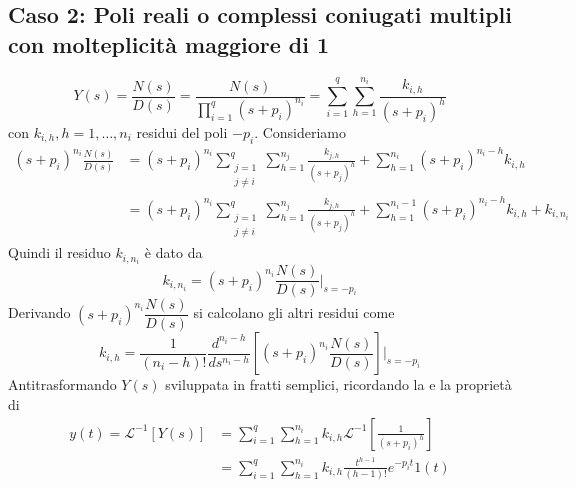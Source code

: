 \documentclass{article}
\numberwithin{equation}{subsection}
\let\oldsubsection\subsection%
\renewcommand{\subsection}{%
  \renewcommand{\theequation}{\thesubsection.\arabic{equation}}%
  \oldsubsection}%
\begin{document}
\subsection{Caso 2: Poli reali o complessi coniugati multipli con molteplicità maggiore di 1}
\begin{equation}
    Y(s) = \frac{N(s)}{D(s)} = \frac{N(s)}{\prod\limits_{i=1}^q (s + p_i)^{n_i}} = \sum_{i=1}^q \sum_{h=1}^{n_i} \frac{k_{i,h}}{(s+p_i)^h}
\end{equation}
con $k_{i,h}, h=1,\dots, n_i$ residui del poli $-p_i$. Consideriamo
\begin{align*}
    (s+p_i)^{n_i} \frac{N(s)}{D(s)}
    &=(s+p_i)^{n_i} \sum_{\substack{j=1\\ j \neq i}}^q \sum_{h=1}^{n_j} \frac{k_{j,h}}{(s+p_j)^h} + \sum_{h=1}^{n_i} (s+p_i)^{n_i - h}k_{i,h}
    \\
    &=(s+p_i)^{n_i} \sum_{\substack{j=1\\ j \neq i}}^q \sum_{h=1}^{n_j} \frac{k_{j,h}}{(s+p_j)^h} + \sum_{h=1}^{n_i-1} (s+p_i)^{n_i - h}k_{i,h} + k_{i,n_i}
\end{align*}
Quindi il residuo $k_{i,n_i}$ è dato da
\begin{equation}
    k_{i,n_i} = (s+p_i)^{n_i} \frac{N(s)}{D(s)} \bigg|_{s=-p_i}
\end{equation}
Derivando $(s+p_i)^{n_i} \dfrac{N(s)}{D(s)}$ si calcolano gli altri residui come
\begin{equation}
    k_{i,h} = \frac{1}{(n_i-h)!} \frac{d^{n_i-h}}{ds^{n_i-h}} \left[(s+p_i)^{n_i} \frac{N(s)}{D(s)}\right] \bigg|_{s=-p_i}
\end{equation}
Antitrasformando $Y(s)$ sviluppata in fratti semplici, ricordando la  e la  proprietà di 
\begin{align*}
    y(t) = \mathcal{L}^{-1} [Y(s)]
    &= \sum_{i=1}^q \sum_{h=1}^{n_i} k_{i,h} \mathcal{L}^{-1} \left[\frac{1}{(s+p_i)^h}\right]
    \\
    &= \sum_{i=1}^q \sum_{h=1}^{n_i} k_{i,h} \frac{t^{h-1}}{(h-1)!}e^{-p_i t}1(t)
\end{align*}
\end{document}
